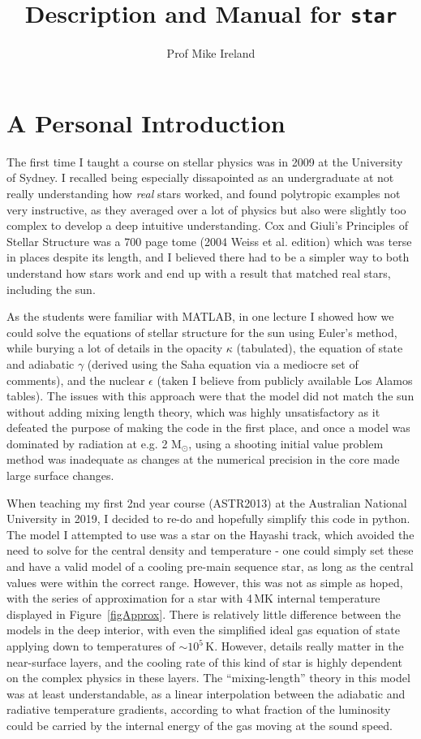 \documentclass[12pt]{article}
\begin{document}
\title{Description and Manual for {\tt star}}
\author{Prof Mike Ireland}
\maketitle

\section{A Personal Introduction}

The first time I taught a course on stellar physics was in 2009 at the University of Sydney.  I recalled being especially dissapointed as an undergraduate at not really understanding how {\em real} stars worked, and found polytropic examples not very instructive, as they averaged over a lot of physics but also were slightly too complex to develop a deep intuitive understanding. Cox and Giuli's Principles of Stellar Structure was a 700 page tome (2004 Weiss et al. edition) which was terse in places despite its length, and I believed there had to be a simpler way to both understand how stars work and end up with a result that matched real stars, including the sun. 

As the students were familiar with MATLAB, in one lecture I showed how we could solve the equations of stellar structure for the sun using Euler's method, while burying a lot of details in the opacity $\kappa$ (tabulated), the equation of state and adiabatic $\gamma$ (derived using the Saha equation via a mediocre set of comments), and the nuclear $\epsilon$ (taken I believe from publicly available Los Alamos tables).  The issues with this approach were that the model did not match the sun without adding mixing length theory, which was highly unsatisfactory as it defeated the purpose of making the code in the first place, and once a model was dominated by radiation at e.g. 2 M$_\odot$, using a shooting initial value problem method was inadequate as changes at the numerical precision in the core made large surface changes. 

When teaching my first 2nd year course (ASTR2013) at the Australian National University in 2019, I decided to re-do and hopefully simplify this code in python. The model I attempted to use was a star on the Hayashi track, which avoided the need to solve for the central density and temperature - one could simply set these and have a valid model of a cooling pre-main sequence star, as long as the central values were within the correct range. However, this was not as simple as hoped, with the series of approximation for a star with 4\,MK internal temperature displayed in Figure~\ref{figApprox}. There is relatively little difference between the models in the deep interior, with even the simplified ideal gas equation of state applying down to temperatures of $\sim 10^5$\,K. However, details really matter in the near-surface layers, and the cooling rate of this kind of star is highly dependent on the complex physics in these layers. The ``mixing-length'' theory in this model was at least understandable, as a linear interpolation between the adiabatic and radiative temperature gradients, according to what fraction of the luminosity could be carried by the internal energy of the gas moving at the sound speed.
\end{document}
